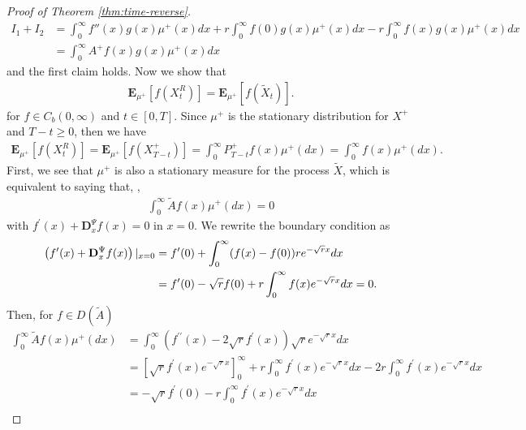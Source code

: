 \documentclass[11pt,a4paper]{article}
\theoremstyle{definition}
\theoremstyle{remark}
\begin{document}
\begin{proof}[Proof of Theorem \ref{thm:time-reverse}]
\begin{align*}
			I_1+I_2&= \int_0^\infty f''(x) g(x) \mu^+(x) dx + r \int_0^\infty f(0) g(x) \mu^+(x) dx - r \int_0^\infty f(x) g(x) \mu^+(x) dx\\
			&=\int_0^\infty A^+ f(x) g(x) \mu^+(x) dx
		\end{align*}
		and the first claim holds. %
		Now we show that
		\begin{align*}
			\mathbf{E}_{\mu^+} [f(X^R_t)]=\mathbf{E}_{\mu^+}[f(\widetilde{X}_t)].
		\end{align*}
		for \(f \in C_b(0,\infty)\) and \(t \in [0,T]\). 
		Since \(\mu^+\) is the stationary distribution for \(X^+\) and \(T-t \geq 0\), then we have
		\begin{align*}
			\mathbf{E}_{\mu^+} [f(X^R_t)]=	\mathbf{E}_{\mu^+}[f(X^+_{T-t})]=\int_0^\infty P_{T-t}^+ f(x) \mu^+(dx)= \int_0^\infty f(x) \mu^+(dx).
		\end{align*}
		First, we see that \(\mu^+\) is also a stationary measure for the process \(\widetilde{X}\), which is equivalent to saying that, \cite[Proposition 9.2]{markov-book},
		\begin{align*}
			\int_0^\infty \widetilde{A}f(x) \mu^+(dx)=0
		\end{align*}
		with \(f^\prime(x) + \mathbf{D}^\Psi_x f(x)=0\) in \(x=0\). We rewrite the boundary condition as
		\begin{align}
			\label{bc-reverse}
			\left(f^\prime(x) + \mathbf{D}^\Psi_x f(x)\right)\vert_{x=0}&=f^\prime(0) + \int_0^\infty (f(x) - f(0)) r e^{-\sqrt{r} x} dx \notag\\
			&=f^\prime(0) - \sqrt{r} f(0) + r \int_0^\infty f(x) e^{-\sqrt{r} x} dx=0.
		\end{align}
		Then, for \(f \in {D(\widetilde{A})} \)
		\begin{align*}
			\int_0^\infty \widetilde{A}f(x) \mu^+(dx)&= \int_0^\infty(f^{\prime \prime}(x) - 2 \sqrt{r} f^\prime(x)) \sqrt{r} e^{-\sqrt{r} x} dx\\
			&=[\sqrt{r} f^\prime(x) e^{-\sqrt{r} x}]^\infty_0 + r \int_0^\infty f^\prime(x) e^{-\sqrt{r}x} dx - 2r\int_0^\infty f^\prime(x) e^{-\sqrt{r}x} dx\\
			&=-\sqrt{r} f^\prime(0) - r \int_0^\infty f^\prime(x) e^{-\sqrt{r}x} dx\\

\end{align*}
\end{proof}
\end{document}
